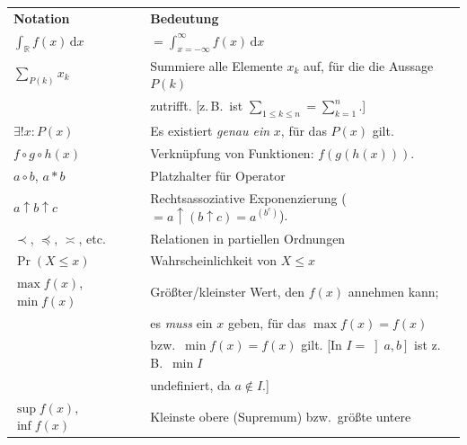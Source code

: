 \documentclass[english,ngerman,fontsize=9pt,intoc,index=totoc,refpage,listof=totoc,draft]{scrbook}
\numberwithin{equation}{section}
\newcommand{\intd}{\,\mathrm{d}}
\begin{document}
\noindent\begin{center}
\noindent\begin{longtable}{l|l}
	\hfil\textbf{Notation}\hfil              & \hfil\textbf{Bedeutung}\hfil                                                  \\[0.666em]
	$\int_\mathbb{R} f(x) \intd x$           & $=\int_{x=-\infty}^\infty f(x) \intd x$                                       \\[0.666em]
	$\sum_{P(k)} x_k$                        & Summiere alle Elemente $x_k$ auf, für die die Aussage $P(k)$                  \\
	                                         & zutrifft. [z.\,B.~ist $\sum_{1 \leq k \leq n} = \sum_{k=1}^n$.]               \\[0.666em]
	$\exists! x : P(x)$                      & Es existiert \emph{genau ein} $x$, für das $P(x)$ gilt.                       \\[0.666em]
	$f \circ g \circ h (x) $                 & Verknüpfung von Funktionen: $f(g(h(x)))$.                                     \\[0.666em]
	$a \circ b$, $a * b$                     & Platzhalter für Operator                                                      \\[0.666em]
	$a \uparrow b \uparrow c$                & Rechtsassoziative Exponenzierung ($= a \uparrow (b \uparrow c) = a^{(b^c)}$). \\[0.666em]
	$\prec$, $\preceq$, $\asymp$, etc.       & Relationen in partiellen Ordnungen                                            \\[0.666em]
	$\Pr(X \leq x)$                          & Wahrscheinlichkeit von $X \leq x$                                             \\[0.666em]
	$\max f(x)$, $\min f(x)$                 & Größter/kleinster Wert, den $f(x)$ annehmen kann;                             \\
	                                         & es \emph{muss} ein $x$ geben, für das $\max f(x) = f(x)$                      \\
	                                         & bzw.~$\min f(x) = f(x)$ gilt. [In $I = \left]a,b\right]$ ist z.\,B.~$\min I$  \\
	                                         & undefiniert, da $a \notin I$.]                                                \\[0.666em]
	$\sup f(x)$, $\inf f(x)$                 & Kleinste obere (Supremum) bzw.~größte untere                                  \\

\end{longtable}
\end{center}
\end{document}
